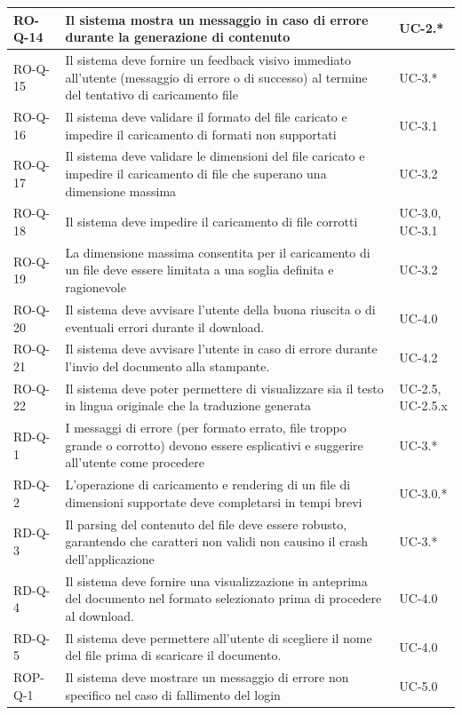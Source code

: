 \documentclass[11pt,a4paper]{article}
\begin{document}
\begin{longtable}{|p{}|>{\raggedright\arraybackslash}p{}|p{}|}
\hline
RO-Q-14 & Il sistema mostra un messaggio in caso di errore durante la generazione di contenuto & UC-2.* \\
\hline
RO-Q-15 & Il sistema deve fornire un feedback visivo immediato all'utente (messaggio di errore o di successo) al termine del tentativo di caricamento file & UC-3.* \\
\hline
RO-Q-16 & Il sistema deve validare il formato del file caricato e impedire il caricamento di formati non supportati & UC-3.1 \\
\hline
RO-Q-17 & Il sistema deve validare le dimensioni del file caricato e impedire il caricamento di file che superano una dimensione massima & UC-3.2 \\
\hline
RO-Q-18 & Il sistema deve impedire il caricamento di file corrotti & UC-3.0, UC-3.1\\
\hline
RO-Q-19 & La dimensione massima consentita per il caricamento di un file deve essere limitata a una soglia definita e ragionevole & UC-3.2 \\
\hline
RO-Q-20 & Il sistema deve avvisare l'utente della buona riuscita o di eventuali errori durante il download. & UC-4.0 \\
\hline
RO-Q-21 & Il sistema deve avvisare l'utente in caso di errore durante l'invio del documento alla stampante. & UC-4.2 \\
\hline
RO-Q-22 & Il sistema deve poter permettere di visualizzare sia il testo in lingua originale che la traduzione generata & UC-2.5, UC-2.5.x \\
\hline
RD-Q-1 & I messaggi di errore (per formato errato, file troppo grande o corrotto) devono essere esplicativi e suggerire all'utente come procedere & UC-3.* \\
\hline
RD-Q-2 & L'operazione di caricamento e rendering di un file di dimensioni supportate deve completarsi in tempi brevi & UC-3.0.*\\
\hline
RD-Q-3 & Il parsing del contenuto del file deve essere robusto, garantendo che caratteri non validi non causino il crash dell'applicazione & UC-3.* \\
\hline
RD-Q-4 & Il sistema deve fornire una visualizzazione in anteprima del documento nel formato selezionato prima di procedere al download. & UC-4.0 \\
\hline
RD-Q-5 & Il sistema deve permettere all'utente di scegliere il nome del file prima di scaricare il documento. & UC-4.0 \\
\hline
ROP-Q-1 & Il sistema deve mostrare un messaggio di errore non specifico nel caso di fallimento del login & UC-5.0 \\

\end{longtable}
\end{document}

